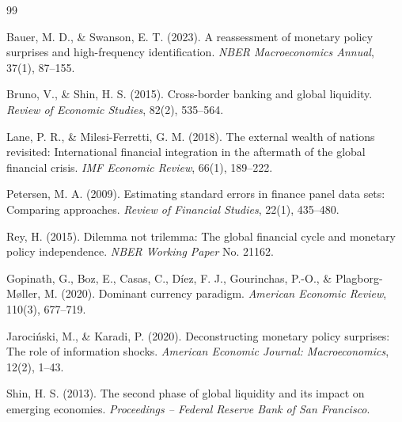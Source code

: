 \documentclass[12pt]{article}
\begin{document}
\newpage

\begin{thebibliography}{99}

Bauer, M. D., \& Swanson, E. T. (2023).
\newblock A reassessment of monetary policy surprises and high-frequency identification.
\newblock \textit{NBER Macroeconomics Annual}, 37(1), 87--155.

Bruno, V., \& Shin, H. S. (2015).
\newblock Cross-border banking and global liquidity.
\newblock \textit{Review of Economic Studies}, 82(2), 535--564.

Lane, P. R., \& Milesi-Ferretti, G. M. (2018).
\newblock The external wealth of nations revisited: International financial integration in the aftermath of the global financial crisis.
\newblock \textit{IMF Economic Review}, 66(1), 189--222.

Petersen, M. A. (2009).
\newblock Estimating standard errors in finance panel data sets: Comparing approaches.
\newblock \textit{Review of Financial Studies}, 22(1), 435--480.

Rey, H. (2015).
\newblock Dilemma not trilemma: The global financial cycle and monetary policy independence.
\newblock \textit{NBER Working Paper} No. 21162.

Gopinath, G., Boz, E., Casas, C., D\'{i}ez, F. J., Gourinchas, P.-O., \& Plagborg-M{\o}ller, M. (2020).
\newblock Dominant currency paradigm.
\newblock \textit{American Economic Review}, 110(3), 677--719.

Jaroci\'{n}ski, M., \& Karadi, P. (2020).
\newblock Deconstructing monetary policy surprises: The role of information shocks.
\newblock \textit{American Economic Journal: Macroeconomics}, 12(2), 1--43.

Shin, H. S. (2013).
\newblock The second phase of global liquidity and its impact on emerging economies.
\newblock \textit{Proceedings -- Federal Reserve Bank of San Francisco}.

\end{thebibliography}

\end{document}

